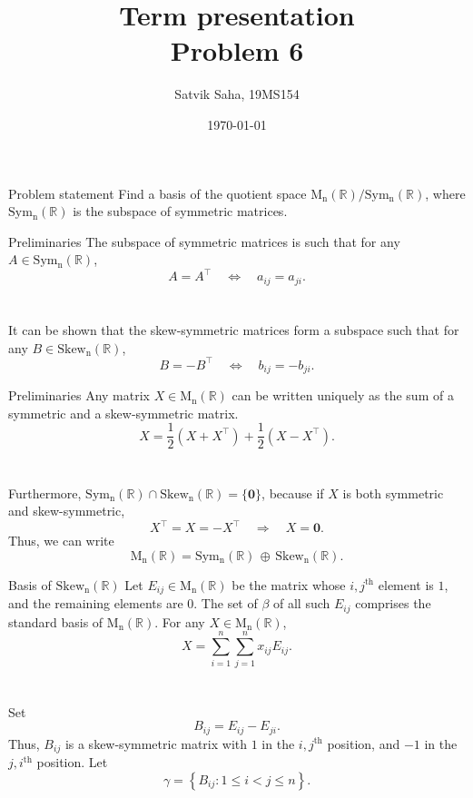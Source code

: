 \documentclass[handout]{beamer}
\title{
        Term presentation \\
        Problem 6
}
\author{Satvik Saha, 19MS154}
\institute{
        MA2102: Linear Algebra I \\
        Indian Institute of Science Education and Research, Kolkata
}
\date{\today}
\def\MnR{\operatorname{M_n(\mathbb{R})}}
\def\Sym{\operatorname{Sym_n(\mathbb{R})}}
\def\Skew{\operatorname{Skew_n(\mathbb{R})}}
\begin{document}
        \maketitle

        \begin{frame}{Problem statement}
                Find a basis of the quotient space $\MnR/\Sym$, where $\Sym$ is the subspace of symmetric matrices.
        \end{frame}

        \begin{frame}{Preliminaries}
                The subspace of symmetric matrices is such that for any $A \in \Sym$,
                \[
                        A = A^\top \quad \Leftrightarrow \quad a_{ij} = a_{ji}.
                \] \\~\\
                \pause
                It can be shown that the skew-symmetric matrices form a subspace such that for any $B \in \Skew$,
                \[
                        B = -B^\top \quad \Leftrightarrow \quad b_{ij} = -b_{ji}.
                \]
        \end{frame}

        \begin{frame}{Preliminaries}
                Any matrix $X \in \MnR$ can be written uniquely as the sum of a symmetric and a skew-symmetric matrix.
                \[
                        X = \frac{1}{2}(X + X^\top) + \frac{1}{2}(X - X^\top).
                \] \\~\\
                \pause
                Furthermore, $\Sym \cap \Skew = \{\mathbf{0}\}$, because if $X$ is both symmetric and skew-symmetric,
                \[
                        X^\top = X = -X^\top \quad \Rightarrow \quad X = \mathbf{0}.
                \]
                \pause
                Thus, we can write
                \[
                        \MnR = \Sym \,\oplus\, \Skew.
                \]
        \end{frame}

        \begin{frame}[t]{Basis of $\Skew$}
                Let $E_{ij} \in \MnR$ be the matrix whose $i, j^\text{th}$ element is $1$, and the remaining elements are $0$.
                The set of $\beta$ of all such $E_{ij}$ comprises the standard basis of $\MnR$. For any $X \in \MnR$, 
                \[
                        X = \sum_{i = 1}^n \sum_{j = 1}^n x_{ij}E_{ij}.
                \]\\~\\
                \pause
                Set
                \[
                        B_{ij} = E_{ij} - E_{ji}.
                \]
                Thus, $B_{ij}$ is a skew-symmetric matrix with $1$ in the $i, j^\text{th}$ position,
                and $-1$ in the $j, i^\text{th}$ position.
                Let
                \[
                        \gamma = \left\{B_{ij}\colon 1 \leq i < j \leq n\right\}.
                \]
        \end{frame}
\end{document}
